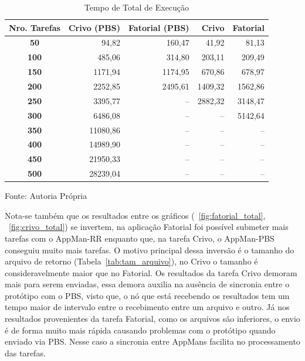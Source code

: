 \begin{table}[hbtp]
\begin{center}
\caption{Tempo de Total de Execução}
\label{tab:tempo_total}
\begin{tabular}{c|r|r|r|r}
	\hline
		{\bf Nro. Tarefas } & {\bf Crivo (PBS)} & {\bf Fatorial (PBS)} & {\bf Crivo} & {\bf Fatorial}\\
	\hline
	{\bf 50} & 94,82 & 160,47 & 41,92 & 81,13\\ \hline
	{\bf 100} & 485,06 & 314,80 & 203,11 & 209,49\\ \hline
	{\bf 150} & 1171,94 & 1174,95 & 670,86 & 678,97\\ \hline
	{\bf 200} & 2252,85 & 2495,61 & 1409,32 & 1562,86\\ \hline
	{\bf 250} & 3395,77 & -- & 2882,32 & 3148,47\\ \hline
	{\bf 300} & 6486,08 & -- & -- & 5142,64\\ \hline
	{\bf 350} & 11080,86 & -- & -- & --\\ \hline
	{\bf 400} & 14989,90 & -- & -- & --\\ \hline
	{\bf 450} & 21950,33 & -- & -- & --\\ \hline
	{\bf 500} & 28239,04 & -- & -- & --\\ \hline
\end{tabular}
\end{center}
\begin{center}
Fonte: Autoria Própria
\end{center}
\end{table}

Nota-se também que os resultados entre os gráficos (~\ref{fig:fatorial_total}, ~\ref{fig:crivo_total}) se invertem, na aplicação Fatorial foi possível submeter mais tarefas com o AppMan-RR enquanto que, na tarefa Crivo, o AppMan-PBS conseguiu muito mais tarefas. O motivo principal dessa inversão é o tamanho do arquivo de retorno (Tabela~\ref{tab:tam_arquivo}), no Crivo o tamanho é consideravelmente maior que no Fatorial. Os resultados da tarefa Crivo demoram mais para serem enviadas, essa demora auxilia na ausência de sincronia entre o protótipo com o PBS, visto que, o nó que está recebendo os resultados tem um tempo maior de intervalo entre o recebimento entre um arquivo e outro. 
Já nos resultados provenientes da tarefa Fatorial, como os arquivos são inferiores, o envio é de forma muito mais rápida causando problemas com o protótipo quando enviado via PBS. Nesse caso a sincronia entre AppMans facilita no processamento das tarefas.

